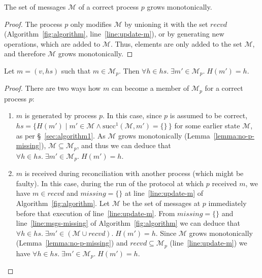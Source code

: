 \documentclass[a4paper,anonymous,USenglish]{lipics-v2019}
\begin{document}
\begin{lemma}\label{lemma:no-p-missing}
The set of messages $\mathcal{M}$ of a correct process $p$ grows monotonically.
\end{lemma}
\begin{proof}
The process $p$ only modifies $\mathcal{M}$ by unioning it with the set $\mathit{recvd}$ (Algorithm~\ref{fig:algorithm}, line~\ref{line:update-m}), or by generating new operations, which are added to $\mathcal{M}$.
Thus, elements are only added to the set $\mathcal{M}$, and therefore $\mathcal{M}$ grows monotonically.
\end{proof}

\begin{lemma}\label{lemma:no-dangling}
Let $m = (v, \mathit{hs})$ such that $m \in \mathcal{M}_p$.
Then $\forall h \in \mathit{hs}.\; \exists m' \in \mathcal{M}_p.\; H(m') = h$.
\end{lemma}
\begin{proof}
There are two ways how $m$ can become a member of $\mathcal{M}_p$ for a correct process $p$:
\begin{enumerate}
    \item $m$ is generated by process $p$.
    In this case, since $p$ is assumed to be correct, $\mathit{hs} = \{H(m') \mid m' \in \mathcal{M} \wedge \mathrm{succ}^1(\mathcal{M}, m') = \{\}\,\}$ for some earlier state $\mathcal{M}$, as per \S~\ref{sec:algorithm1}.
    As $\mathcal{M}$ grows monotonically (Lemma~\ref{lemma:no-p-missing}), $\mathcal{M} \subseteq \mathcal{M}_p$, and thus we can deduce that $\forall h \in \mathit{hs}.\; \exists m' \in \mathcal{M}_p.\; H(m') = h$.
    \item $m$ is received during reconciliation with another process (which might be faulty).
    In this case, during the run of the protocol at which $p$ received $m$, we have $m \in \mathit{recvd}$ and $\mathit{missing} = \{\}$ at line~\ref{line:update-m} of Algorithm~\ref{fig:algorithm}.
    Let $\mathcal{M}$ be the set of messages at $p$ immediately before that execution of line~\ref{line:update-m}.
    From $\mathit{missing} = \{\}$ and line~\ref{line:msgs-missing} of Algorithm~\ref{fig:algorithm} we can deduce that $\forall h \in \mathit{hs}.\; \exists m' \in (\mathcal{M} \cup \mathit{recvd}).\; H(m') = h$.
    Since $\mathcal{M}$ grows monotonically (Lemma~\ref{lemma:no-p-missing}) and $\mathit{recvd} \subseteq \mathcal{M}_p$ (line~\ref{line:update-m}) we have $\forall h \in \mathit{hs}.\; \exists m' \in \mathcal{M}_p.\; H(m') = h$.
\end{enumerate}
\end{proof}
\end{document}
